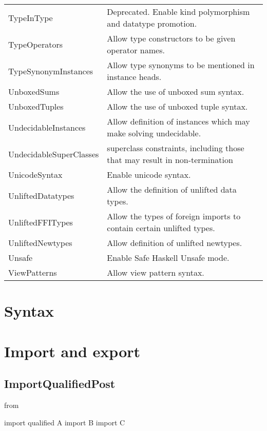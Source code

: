 \documentclass[openany, 12pt]{book}
\begin{document}
\begin{center}
\begin{supertabular}{ll}
		TypeInType                 & Deprecated. Enable kind polymorphism and datatype promotion.               \\
		TypeOperators              & Allow type constructors to be given operator names.                        \\
		TypeSynonymInstances       & Allow type synonyms to be mentioned in instance heads.                     \\
		UnboxedSums                & Allow the use of unboxed sum syntax.                                       \\
		UnboxedTuples              & Allow the use of unboxed tuple syntax.                                     \\
		UndecidableInstances       & Allow definition of instances which may make solving undecidable.          \\
		UndecidableSuperClasses    & superclass constraints, including those that may result in non-termination \\
		UnicodeSyntax              & Enable unicode syntax.                                                     \\
		UnliftedDatatypes          & Allow the definition of unlifted data types.                               \\
		UnliftedFFITypes           & Allow the types of foreign imports to contain certain unlifted types.      \\
		UnliftedNewtypes           & Allow definition of unlifted newtypes.                                     \\
		Unsafe                     & Enable Safe Haskell Unsafe mode.                                           \\
		ViewPatterns               & Allow view pattern syntax.                                                 \\
		\bottomrule
	\end{supertabular}
\end{center}

\part{Syntax}
\part{Import and export}

\chapter{ImportQualifiedPost}
from
\begin{haskell}{}
import qualified A
import           B
import           C
\end{haskell}
\end{document}
